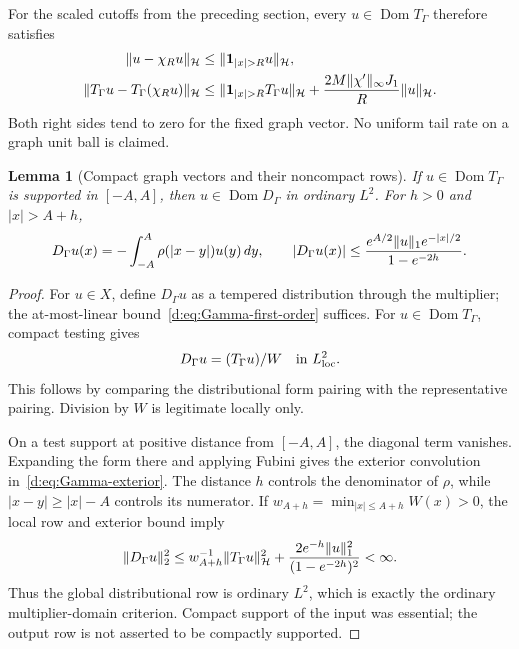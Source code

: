 \documentclass[11pt,a4paper]{article}
\numberwithin{equation}{section}
\newtheorem{lemma}[theorem]{Lemma}
\theoremstyle{definition}\newtheorem{definition}[theorem]{Definition}
\theoremstyle{remark}\newtheorem{remark}[theorem]{Remark}
\newcommand{\Hh}{\mathcal H}\newcommand{\Hw}{\mathcal H}
\begin{document}
For the scaled cutoffs from the preceding section, every $u\in\operatorname{Dom}T_\Gamma$ therefore satisfies
\begin{align}
 \norm{u-\chi_Ru}_{\Hh}&\le\norm{\boldsymbol1_{|x|>R}u}_{\Hh},\notag\\
 \norm{T_\Gamma u-T_\Gamma(\chi_Ru)}_{\Hh}
 &\le\norm{\boldsymbol1_{|x|>R}T_\Gamma u}_{\Hh}
       +\frac{2M\norm{\chi'}_\infty J_1}{R}\norm{u}_{\Hh}.
 \label{d:eq:Gamma-cutoff-graph}
\end{align}
Both right sides tend to zero for the fixed graph vector. No uniform tail rate on a graph unit ball is claimed.

\begin{lemma}[Compact graph vectors and their noncompact rows]\label{d:lem:Gamma-compact-row}
If $u\in\operatorname{Dom}T_\Gamma$ is supported in $[-A,A]$, then $u\in\operatorname{Dom}D_\Gamma$ in ordinary $L^2$. For $h>0$ and $|x|>A+h$,
\begin{equation}\label{d:eq:Gamma-exterior}
 D_\Gamma u(x)=-\int_{-A}^A\rho(|x-y|)u(y)\,dy,
 \qquad
 |D_\Gamma u(x)|\le
 \frac{e^{A/2}\lVert u\rVert_1e^{-|x|/2}}{1-e^{-2h}}.
\end{equation}
\end{lemma}
\begin{proof}
For $u\in{X}$, define $D_\Gamma u$ as a tempered distribution through the multiplier; the at-most-linear bound~\eqref{d:eq:Gamma-first-order} suffices. For $u\in\operatorname{Dom}T_\Gamma$, compact testing gives
\begin{equation}\label{d:eq:Gamma-local-row}
 D_\Gamma u=(T_\Gamma u)/W\quad\hbox{in }L^2_{\rm loc}.
\end{equation}
This follows by comparing the distributional form pairing with the representative pairing. Division by $W$ is legitimate locally only.

On a test support at positive distance from $[-A,A]$, the diagonal term vanishes. Expanding the form there and applying Fubini gives the exterior convolution in~\eqref{d:eq:Gamma-exterior}. The distance $h$ controls the denominator of $\rho$, while $|x-y|\ge|x|-A$ controls its numerator. If
$w_{A+h}=\min_{|x|\le A+h}W(x)>0$, the local row and exterior bound imply
\[
 \norm{D_\Gamma u}_2^2
 \le w_{A+h}^{-1}\norm{T_\Gamma u}_{\Hh}^2
       +\frac{2e^{-h}\norm{u}_1^2}{(1-e^{-2h})^2}<\infty.
\]
Thus the global distributional row is ordinary $L^2$, which is exactly the ordinary multiplier-domain criterion. Compact support of the input was essential; the output row is not asserted to be compactly supported.
\end{proof}
\end{document}
